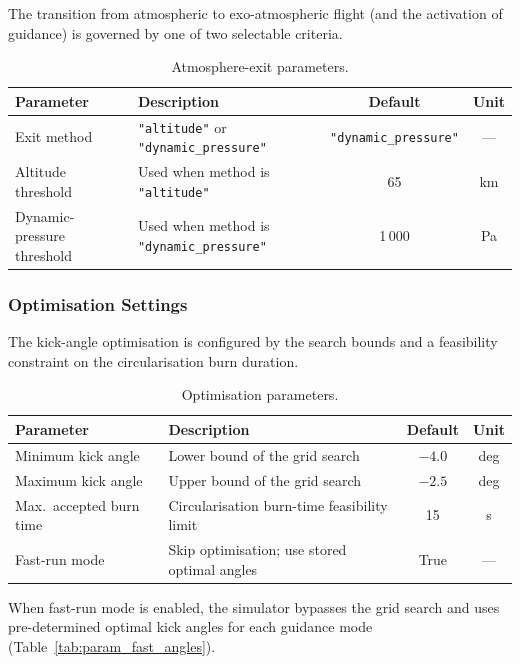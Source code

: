 The transition from atmospheric to exo-atmospheric flight (and the activation
of guidance) is governed by one of two selectable criteria.

\begin{table}[htbp]
  \centering
  \caption{Atmosphere-exit parameters.}
  \label{tab:param_atmo_exit}
  \begin{tabular}{l l c c}
    \toprule
    \textbf{Parameter} & \textbf{Description} & \textbf{Default} & \textbf{Unit} \\
    \midrule
    Exit method
      & \texttt{"altitude"} or \texttt{"dynamic\_pressure"}
      & \texttt{"dynamic\_pressure"} & --- \\
    Altitude threshold
      & Used when method is \texttt{"altitude"}
      & 65 & km \\
    Dynamic-pressure threshold
      & Used when method is \texttt{"dynamic\_pressure"}
      & 1\,000 & Pa \\
    \bottomrule
  \end{tabular}
\end{table}

\subsubsection{Optimisation Settings}

The kick-angle optimisation is configured by the search bounds and a
feasibility constraint on the circularisation burn duration.

\begin{table}[htbp]
  \centering
  \caption{Optimisation parameters.}
  \label{tab:param_opt}
  \begin{tabular}{l l c c}
    \toprule
    \textbf{Parameter} & \textbf{Description} & \textbf{Default} & \textbf{Unit} \\
    \midrule
    Minimum kick angle
      & Lower bound of the grid search
      & $-4.0$ & deg \\
    Maximum kick angle
      & Upper bound of the grid search
      & $-2.5$ & deg \\
    Max.\ accepted burn time
      & Circularisation burn-time feasibility limit
      & 15 & s \\
    Fast-run mode
      & Skip optimisation; use stored optimal angles
      & True & --- \\
    \bottomrule
  \end{tabular}
\end{table}

When fast-run mode is enabled, the simulator bypasses the grid search and uses
pre-determined optimal kick angles for each guidance mode
(Table~\ref{tab:param_fast_angles}).

